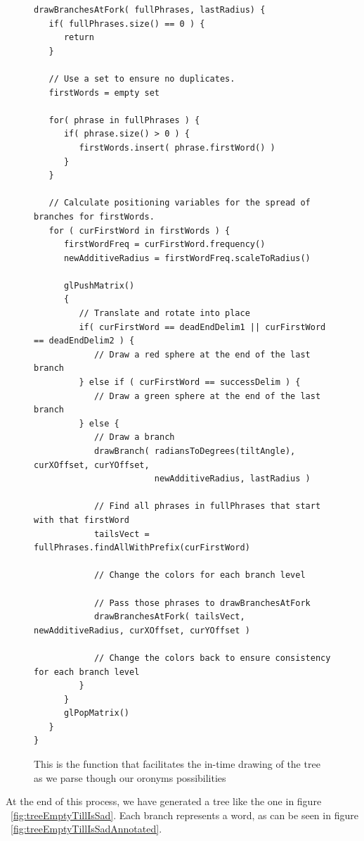 \begin{figure}
\begin{adjustwidth}{-1in}{}
\begin{verbatim}
drawBranchesAtFork( fullPhrases, lastRadius) {
   if( fullPhrases.size() == 0 ) {
      return
   }
   
   // Use a set to ensure no duplicates.
   firstWords = empty set
   
   for( phrase in fullPhrases ) {
      if( phrase.size() > 0 ) {
         firstWords.insert( phrase.firstWord() )
      }
   }
   
   // Calculate positioning variables for the spread of branches for firstWords.
   for ( curFirstWord in firstWords ) {
      firstWordFreq = curFirstWord.frequency()
      newAdditiveRadius = firstWordFreq.scaleToRadius()

      glPushMatrix()
      {
         // Translate and rotate into place
         if( curFirstWord == deadEndDelim1 || curFirstWord == deadEndDelim2 ) {
            // Draw a red sphere at the end of the last branch
         } else if ( curFirstWord == successDelim ) {
            // Draw a green sphere at the end of the last branch
         } else {
            // Draw a branch
            drawBranch( radiansToDegrees(tiltAngle), curXOffset, curYOffset,
                        newAdditiveRadius, lastRadius )
            
            // Find all phrases in fullPhrases that start with that firstWord
            tailsVect = fullPhrases.findAllWithPrefix(curFirstWord)
            
            // Change the colors for each branch level

            // Pass those phrases to drawBranchesAtFork
            drawBranchesAtFork( tailsVect, newAdditiveRadius, curXOffset, curYOffset )
            
            // Change the colors back to ensure consistency for each branch level
         }
      }
      glPopMatrix()
   }
}
\end{verbatim}
\end{adjustwidth}
\captionfonts
\caption[Code for drawBranchesAtFork]{ This is the function that facilitates the in-time drawing of the tree as we parse though our oronyms possibilities }
\label{fig:psuedoCode:drawBranchesAtFork}
\end{figure}

At the end of this process, we have generated a tree like the one in figure ~\ref{fig:treeEmptyTillIsSad}.  Each branch represents a word, as can be seen in figure ~\ref{fig:treeEmptyTillIsSadAnnotated}.



